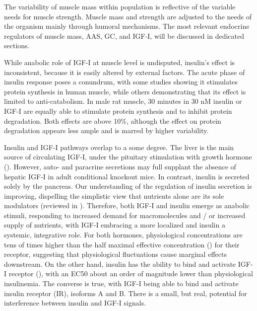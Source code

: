 \documentclass[12pt,english]{report}\usepackage[]{graphicx}\usepackage[]{color}
\begin{document}
The variability of muscle mass within population is reflective of
the variable needs for muscle strength. Muscle mass and strength are
adjusted to the needs of the organism mainly through humoral mechanisms.
The most relevant endocrine regulators of muscle mass, AAS, GC, and
IGF-I, will be discussed in dedicated sections.

While anabolic role of IGF-I at muscle level is undisputed, insulin's
effect is inconsistent, because it is easily altered by external factors.
The acute phase of insulin response poses a conundrum, with some studies
showing it stimulates protein synthesis in human muscle\citep{biolo1995physiologic},
while others demonstrating that its effect is limited to anti-catabolism\citep{chow2006mechanism}.
In male rat muscle, 30 minutes in 30 nM insulin or IGF-I are equally
able to stimulate protein synthesis and to inhibit protein degradation\citep{dardevet1998glucocorticoid}.
Both effects are above 10\%, although the effect on protein degradation
appears less ample and is marred by higher variability.

Insulin and IGF-I pathways overlap to a some degree. The liver is
the main source of circulating IGF-I, under the pituitary stimulation
with growth hormone (). However,
auto- and paracrine secretions may full supplant the absence of hepatic
IGF-I in adult conditional knockout mice\citep{sjogren1999liver-derived}.
In contrast, insulin is secreted solely by the pancreas. Our understanding
of the regulation of insulin secretion is improving, dispelling the
simplistic view that nutrients alone are its sole modulators (reviewed
in \citep{rorsman2013regulation}). Therefore, both IGF-I and insulin
emerge as anabolic stimuli, responding to increased demand for macromolecules
and / or increased supply of nutrients, with IGF-I embracing a more
localized and insulin a systemic, integrative role. For both hormones,
physiological concentrations are tens of times higher than the half
maximal effective concentration ()
for their receptor, suggesting that physiological fluctuations cause
marginal effects downstream\citep{soos1990receptors,pandini2002insulin/insulin-like}.
On the other hand, insulin has the ability to bind and activate IGF-I
receptor (), with an EC50 about
an order of magnitude lower than physiological insulinemia. The converse
is true, with IGF-I being able to bind and activate insulin receptor
(IR), isoforms A and B. There is a small, but real, potential for
interference between insulin and IGF-I signals.
\end{document}
